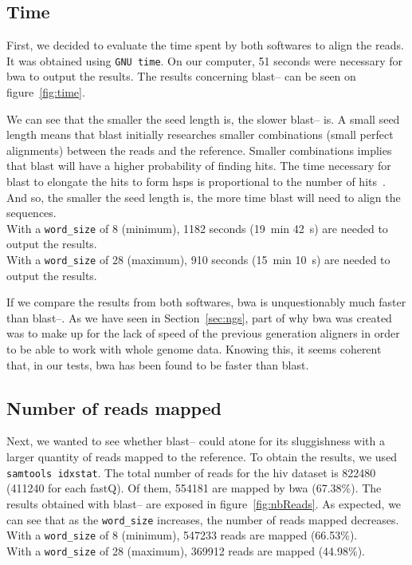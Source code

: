 \subsection{Time}
First, we decided to evaluate the time spent by both softwares to align the reads.
It was obtained using \texttt{GNU time}.
On our computer, 51 seconds were necessary for \gls{bwa} to output the results.
The results concerning \gls{blast}--\blastobam{} can be seen on figure~\ref{fig:time}.

We can see that the smaller the seed length is, the slower \gls{blast}--\blastobam{} is.
A small seed length means that \gls{blast} initially researches smaller combinations (small perfect alignments) between the reads and the reference.
Smaller combinations implies that \gls{blast} will have a higher probability of finding hits.
The time necessary for \gls{blast} to elongate the hits to form \glspl{hsp} is proportional to the number of hits~\cite{Altschul1990}.
And so, the smaller the seed length is, the more time \gls{blast} will need to align the sequences.\\
With a \texttt{word\_size} of 8 (minimum), 1182 seconds (19~min 42~s) are needed to output the results.\\
With a \texttt{word\_size} of 28 (maximum), 910 seconds (15~min 10~s) are needed to output the results.

If we compare the results from both softwares, \gls{bwa} is unquestionably much faster than \gls{blast}--\blastobam{}.
As we have seen in Section~\ref{sec:ngs}, part of why \gls{bwa} was created was to make up for the lack of speed of the previous generation aligners in order to be able to work with whole genome data.
Knowing this, it seems coherent that, in our tests, \gls{bwa} has been found to be faster than \gls{blast}.


\subsection{Number of reads mapped}
Next, we wanted to see whether \gls{blast}--\blastobam{} could atone for its sluggishness with a larger quantity of reads mapped to the reference.
To obtain the results, we used \texttt{samtools idxstat}.
The total number of reads for the \gls{hiv} dataset is 822480 (411240 for each fastQ).
Of them, 554181 are mapped by \gls{bwa} (67.38\%).
The results obtained with \gls{blast}--\blastobam{} are exposed in figure~\ref{fig:nbReads}.
As expected, we can see that as the \texttt{word\_size} increases, the number of reads mapped decreases.\\
With a \texttt{word\_size} of 8 (minimum), 547233 reads are mapped (66.53\%).\\
With a \texttt{word\_size} of 28 (maximum), 369912 reads are mapped (44.98\%).

